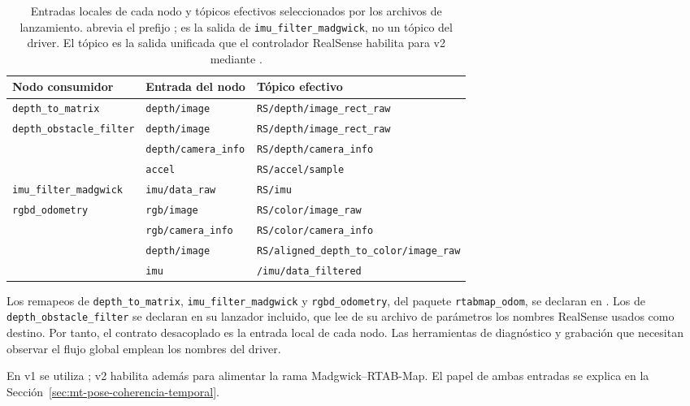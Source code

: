 \begin{table}[htbp]
\centering
\small
\begin{tabular}{p{}p{}p{}}
\hline
\textbf{Nodo consumidor} & \textbf{Entrada del nodo} & \textbf{Tópico efectivo} \\
\hline
\texttt{depth\_to\_matrix} & \texttt{depth/image} & \texttt{RS/depth/image\_rect\_raw} \\
\texttt{depth\_obstacle\_filter} & \texttt{depth/image} & \texttt{RS/depth/image\_rect\_raw} \\
 & \texttt{depth/camera\_info} & \texttt{RS/depth/camera\_info} \\
 & \texttt{accel} & \texttt{RS/accel/sample} \\
\texttt{imu\_filter\_madgwick} & \texttt{imu/data\_raw} & \texttt{RS/imu} \\
\texttt{rgbd\_odometry} & \texttt{rgb/image} & \texttt{RS/color/image\_raw} \\
 & \texttt{rgb/camera\_info} & \texttt{RS/color/camera\_info} \\
 & \texttt{depth/image} & \texttt{RS/aligned\_depth\_to\_color/image\_raw} \\
 & \texttt{imu} & \texttt{/imu/data\_filtered} \\
\hline
\end{tabular}
\caption[Entradas locales y tópicos efectivos de los consumidores]{Entradas locales de cada nodo
y tópicos efectivos seleccionados por los archivos de lanzamiento.  abrevia el prefijo
;  es la salida de
\texttt{imu\_filter\_madgwick}, no un tópico del driver. El tópico  es la salida
unificada que el controlador RealSense habilita para v2 mediante
.}
\label{tab:remapper}
\end{table}

Los remapeos de \texttt{depth\_to\_matrix}, \texttt{imu\_filter\_madgwick} y
\texttt{rgbd\_odometry}, del paquete \texttt{rtabmap\_odom}, se declaran en . Los de
\texttt{depth\_obstacle\_filter} se declaran en su lanzador incluido, que lee de su archivo de
parámetros los nombres RealSense usados como destino. Por tanto, el contrato desacoplado es la
entrada local de cada nodo. Las herramientas de diagnóstico y grabación que necesitan observar el
flujo global emplean los nombres del driver.

En v1 se utiliza ; v2 habilita además  para alimentar la rama
Madgwick--RTAB-Map. El papel de ambas entradas se explica en la
Sección~\ref{sec:mt-pose-coherencia-temporal}.

